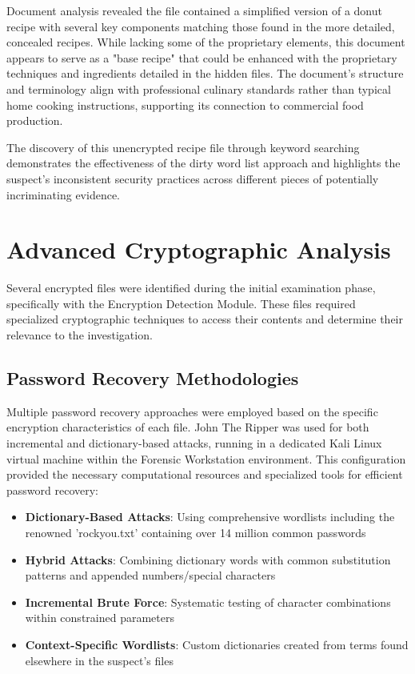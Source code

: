 Document analysis revealed the file contained a simplified version of a donut recipe with several key components matching those found in the more detailed, concealed recipes. While lacking some of the proprietary elements, this document appears to serve as a "base recipe" that could be enhanced with the proprietary techniques and ingredients detailed in the hidden files. The document's structure and terminology align with professional culinary standards rather than typical home cooking instructions, supporting its connection to commercial food production.

The discovery of this unencrypted recipe file through keyword searching demonstrates the effectiveness of the dirty word list approach and highlights the suspect's inconsistent security practices across different pieces of potentially incriminating evidence.

\section{Advanced Cryptographic Analysis}
Several encrypted files were identified during the initial examination phase, specifically with the Encryption Detection Module. These files required specialized cryptographic techniques to access their contents and determine their relevance to the investigation.

\subsection{Password Recovery Methodologies}
Multiple password recovery approaches were employed based on the specific encryption characteristics of each file. John The Ripper was used for both incremental and dictionary-based attacks, running in a dedicated Kali Linux virtual machine within the Forensic Workstation environment. This configuration provided the necessary computational resources and specialized tools for efficient password recovery:

\begin{itemize}
    \item \textbf{Dictionary-Based Attacks}: Using comprehensive wordlists including the renowned 'rockyou.txt' containing over 14 million common passwords
    \item \textbf{Hybrid Attacks}: Combining dictionary words with common substitution patterns and appended numbers/special characters
    \item \textbf{Incremental Brute Force}: Systematic testing of character combinations within constrained parameters
    \item \textbf{Context-Specific Wordlists}: Custom dictionaries created from terms found elsewhere in the suspect's files
\end{itemize}

